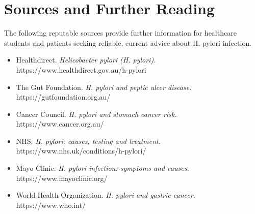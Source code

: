 \section*{Sources and Further Reading}
The following reputable sources provide further information for healthcare students and patients seeking reliable, current advice about H. pylori infection.

\begin{itemize}
    \item Healthdirect. \textit{Helicobacter pylori (H. pylori).} https://www.healthdirect.gov.au/h-pylori
    \item The Gut Foundation. \textit{H. pylori and peptic ulcer disease.} https://gutfoundation.org.au/
    \item Cancer Council. \textit{H. pylori and stomach cancer risk.} https://www.cancer.org.au/
    \item NHS. \textit{H. pylori: causes, testing and treatment.} https://www.nhs.uk/conditions/h-pylori/
    \item Mayo Clinic. \textit{H. pylori infection: symptoms and causes.} https://www.mayoclinic.org/
    \item World Health Organization. \textit{H. pylori and gastric cancer.} https://www.who.int/
\end{itemize}
